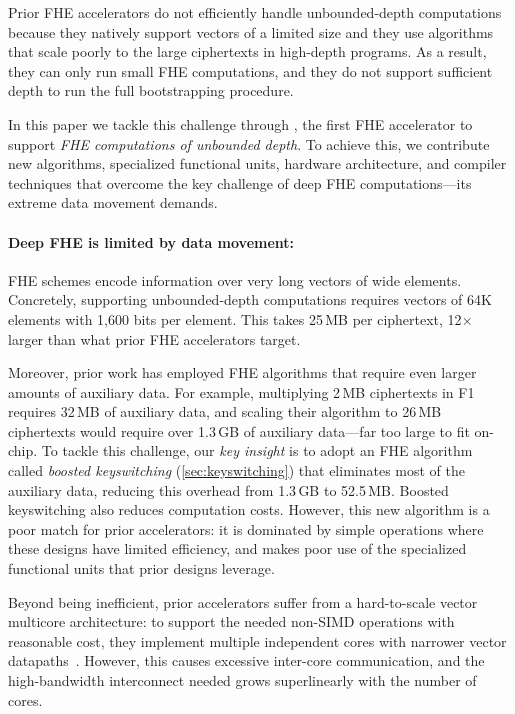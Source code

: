 Prior FHE accelerators do not efficiently handle unbounded-depth computations because
they natively support vectors of a limited size and they use algorithms that scale poorly
to the large ciphertexts in high-depth programs.
As a result, they can only run small FHE computations, and they do not support sufficient depth
to run the full bootstrapping procedure.


In this paper we tackle this challenge through \name, the first FHE accelerator
to support \emph{FHE computations of unbounded depth}.
To achieve this, we contribute new algorithms, specialized functional units,
hardware architecture, and compiler techniques that overcome the key challenge
of deep FHE computations---its extreme data movement demands.

\paragraph{Deep FHE is limited by data movement:}
FHE schemes encode information over very long vectors of wide elements.
Concretely, supporting unbounded-depth computations requires vectors of
64K elements with 1,600 bits per element.
This takes 25\,MB per ciphertext, 12$\times$ larger than what prior FHE accelerators target.

Moreover, prior work has employed FHE algorithms that require even larger amounts of auxiliary data.
For example, multiplying 2\,MB ciphertexts in F1~\cite{feldmann:micro21:f1} requires 32\,MB of auxiliary data,
and scaling their algorithm to 26\,MB ciphertexts would require over
1.3\,GB 
of auxiliary data---far too large to fit on-chip.
To tackle this challenge, our \emph{key insight} is to adopt an FHE
algorithm called \emph{boosted keyswitching} (\autoref{sec:keyswitching}) that eliminates most of the
auxiliary data,
reducing this overhead from 1.3\,GB to 52.5\,MB.
Boosted keyswitching also reduces computation costs.
However, this new algorithm is a poor match for prior accelerators:
it is dominated by simple operations where these designs have limited efficiency,
and makes poor use of the specialized functional units that prior designs leverage.

Beyond being inefficient, prior accelerators suffer from a hard-to-scale vector multicore architecture:
to support the needed non-SIMD operations with reasonable cost,
they implement multiple independent cores with narrower vector datapaths~\cite{feldmann:micro21:f1}.
However, this causes excessive inter-core communication,
and the high-bandwidth interconnect
needed grows superlinearly with the number of cores.


